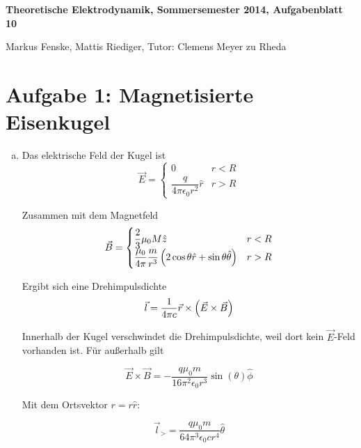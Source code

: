 \documentclass[a4paper,german,12pt,smallheadings]{scrartcl}
\begin{document}
\allowdisplaybreaks %
\begin{center}
\bfseries %
\sffamily %
\vspace{-40pt}
Theoretische Elektrodynamik, Sommersemester 2014, Aufgabenblatt 10

Markus Fenske, Mattis Riediger, Tutor: Clemens Meyer zu Rheda
\vspace{-10pt}
\end{center}

\section*{Aufgabe 1: Magnetisierte Eisenkugel}
\begin{enumerate}[a)]
  \item
Das elektrische Feld der Kugel ist
\begin{equation}
  \vec{E} = \begin{cases}
    0 & r < R \\
    \dfrac{q}{4 \pi \epsilon_0 r^2} \hat{r} & r > R
  \end{cases}
\end{equation}

Zusammen mit dem Magnetfeld
\begin{equation}
  \vec{B} = \begin{cases}
    \dfrac{2}{3} \mu_0 M \hat{z} & r < R \\
    \dfrac{\mu_0}{4 \pi} \dfrac{m}{r^3} \del{
      2 \cos \theta \hat{r} + \sin \theta \hat{\theta}
    } & r > R
  \end{cases}
\end{equation}

Ergibt sich eine Drehimpulsdichte
\begin{align*}
  \vec{l} = \frac{1}{4 \pi c} \vec{r} \times \del{\vec{E} \times \vec{B}}
\end{align*}

Innerhalb der Kugel verschwindet die Drehimpulsdichte, weil dort kein
$\vec{E}$-Feld vorhanden ist. Für außerhalb gilt

\begin{equation}
  \vec{E} \times \vec{B} = -\frac{q \mu_0 m}{16 \pi^2 \epsilon_0 r^3} \sin(\theta) \hat{\phi}
\end{equation}

Mit dem Ortsvektor $r = r \hat{r}$:

\begin{equation}
  \vec{l}_{>} = \frac{q \mu_0 m}{64 \pi^3 \epsilon_0 c r^4} \hat{\theta}
\end{equation}


\end{enumerate}
\end{document}
